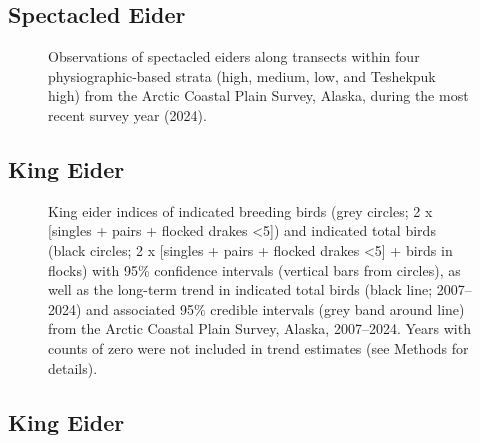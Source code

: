 \documentclass[
]{article}
\begin{document}
\subsection*{Spectacled Eider}\label{spectacled-eider-2}

\begin{figure}


\caption{\label{fig-SPEImap}Observations of spectacled eiders along
transects within four physiographic-based strata (high, medium, low, and
Teshekpuk high) from the Arctic Coastal Plain Survey, Alaska, during the
most recent survey year (2024).}

\end{figure}%

\newpage{}

\subsection*{King Eider}\label{king-eider}

\begin{figure}


\caption{\label{fig-KIEI}King eider indices of indicated breeding birds
(grey circles; 2 x {[}singles + pairs + flocked drakes \textless5{]})
and indicated total birds (black circles; 2 x {[}singles + pairs +
flocked drakes \textless5{]} + birds in flocks) with 95\% confidence
intervals (vertical bars from circles), as well as the long-term trend
in indicated total birds (black line; 2007--2024) and associated 95\%
credible intervals (grey band around line) from the Arctic Coastal Plain
Survey, Alaska, 2007--2024. Years with counts of zero were not included
in trend estimates (see Methods for details).}

\end{figure}%

\newpage{}

\subsection*{King Eider}\label{king-eider-1}
\end{document}
